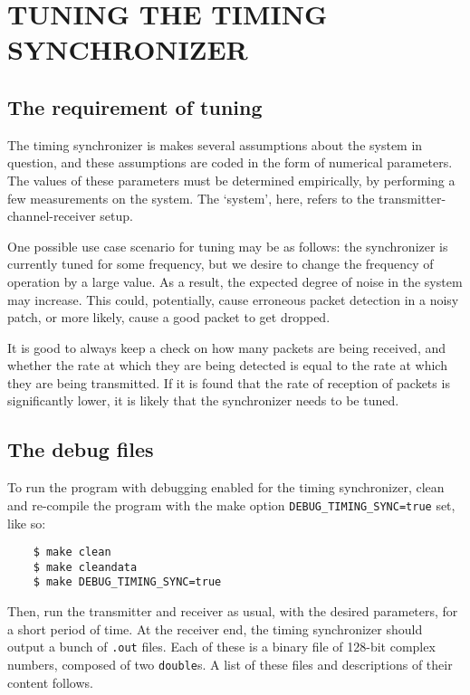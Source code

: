 \appendix

\chapter{TUNING THE TIMING SYNCHRONIZER}
\label{app:tuning}

\section{The requirement of tuning}

The timing synchronizer is makes several assumptions about the system in
question, and these assumptions are coded in the form of numerical parameters.
The values of these parameters must be determined empirically, by performing a
few measurements on the system. The `system', here, refers to the
transmitter-channel-receiver setup.

One possible use case scenario for tuning may be as follows: the synchronizer
is currently tuned for some frequency, but we desire to change the frequency of
operation by a large value. As a result, the expected degree of noise in the
system may increase. This could, potentially, cause erroneous packet detection
in a noisy patch, or more likely, cause a good packet to get dropped.

It is good to always keep a check on how many packets are being received, and
whether the rate at which they are being detected is equal to the rate at which
they are being transmitted. If it is found that the rate of reception of
packets is significantly lower, it is likely that the synchronizer needs to be
tuned.


\section{The debug files}

To run the program with debugging enabled for the timing synchronizer, clean
and re-compile the program with the make option \verb!DEBUG_TIMING_SYNC=true!
set, like so:
\lstset{language=}
\begin{lstlisting}
	$ make clean
	$ make cleandata
	$ make DEBUG_TIMING_SYNC=true
\end{lstlisting}
\lstset{language=C++}

Then, run the transmitter and receiver as usual, with the desired parameters,
for a short period of time. At the receiver end, the timing synchronizer should
output a bunch of \texttt{.out} files. Each of these is a binary file of
128-bit complex numbers, composed of two \lstinline!double!s. A list of these
files and descriptions of their content follows.

